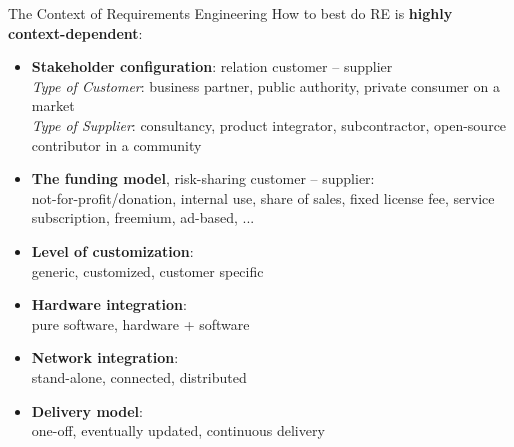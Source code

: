 \documentclass{beamer}
\begin{document}
\begin{frame}[fragile]{The Context of Requirements Engineering}
How to best do RE is \textbf{highly context-dependent}:
\begin{itemize} 
\item \textbf{Stakeholder configuration}: relation customer -- supplier
\\\textit{Type of Customer}: business partner, public authority, private consumer on a market
\\\textit{Type of Supplier}: consultancy, product integrator, subcontractor, open-source contributor in a community
\item \textbf{The funding model}, risk-sharing customer -- supplier:
\\not-for-profit/donation, internal use, share of sales, fixed license fee, service subscription, freemium, ad-based, ... 
\item \textbf{Level of customization}:
\\generic, customized, customer specific
\item \textbf{Hardware integration}:
\\pure software, hardware + software
\item \textbf{Network integration}:
\\stand-alone, connected, distributed
\item \textbf{Delivery model}:
\\one-off, eventually updated, continuous delivery
\end{itemize}
\end{frame}
\end{document}
